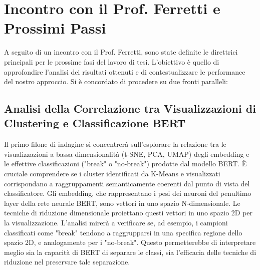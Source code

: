 \documentclass[11pt, a4paper]{article}
\begin{document}
\section{Incontro con il Prof. Ferretti e Prossimi Passi}
A seguito di un incontro con il Prof. Ferretti, sono state definite le direttrici principali per le prossime fasi del lavoro di tesi. L'obiettivo è quello di approfondire l'analisi dei risultati ottenuti e di contestualizzare le performance del nostro approccio. Si è concordato di procedere su due fronti paralleli:

\subsection{Analisi della Correlazione tra Visualizzazioni di Clustering e Classificazione BERT}
Il primo filone di indagine si concentrerà sull'esplorare la relazione tra le visualizzazioni a bassa dimensionalità (t-SNE, PCA, UMAP) degli embedding e le effettive classificazioni ("break" o "no-break") prodotte dal modello BERT. È cruciale comprendere se i cluster identificati da K-Means e visualizzati corrispondano a raggruppamenti semanticamente coerenti dal punto di vista del classificatore.
Gli embedding, che rappresentano i pesi dei neuroni del penultimo layer della rete neurale BERT, sono vettori in uno spazio N-dimensionale. Le tecniche di riduzione dimensionale proiettano questi vettori in uno spazio 2D per la visualizzazione. L'analisi mirerà a verificare se, ad esempio, i campioni classificati come "break" tendono a raggrupparsi in una specifica regione dello spazio 2D, e analogamente per i "no-break". Questo permetterebbe di interpretare meglio sia la capacità di BERT di separare le classi, sia l'efficacia delle tecniche di riduzione nel preservare tale separazione.
\end{document}
